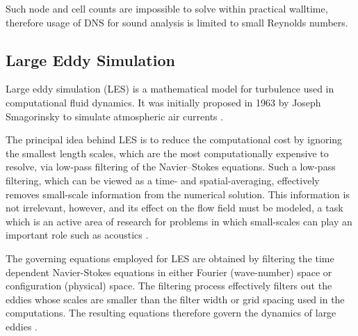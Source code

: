 Such node and cell counts are impossible to solve within practical walltime, therefore usage of DNS for sound analysis is limited to small Reynolds numbers.




\subsection{Large Eddy Simulation} \label{LES}
Large eddy simulation (LES) is a mathematical model for turbulence used in computational fluid dynamics. It was initially proposed in 1963 by Joseph Smagorinsky to simulate atmospheric air currents \citep{LES1}.

The principal idea behind LES is to reduce the computational cost by ignoring the smallest length scales, which are the most computationally expensive to resolve, via low-pass filtering of the Navier–Stokes equations. Such a low-pass filtering, which can be viewed as a time- and spatial-averaging, effectively removes small-scale information from the numerical solution. This information is not irrelevant, however, and its effect on the flow field must be modeled, a task which is an active area of research for problems in which small-scales can play an important role such as acoustics \citep{LES2}.

The governing equations employed for LES are obtained by filtering the time dependent Navier-Stokes equations in either Fourier (wave-number) space or configuration (physical) space. The filtering process effectively filters out the eddies whose scales are smaller than the filter width or grid spacing used in the computations. The resulting equations therefore govern the dynamics of large eddies \citep{fluenttheory}.

